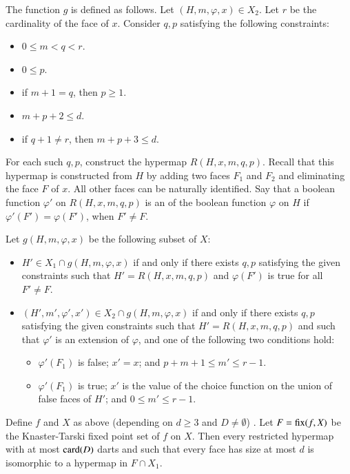 The function $g$ is defined as follows.  Let $(H,m,\varphi,x)\in X_2$.
Let $r$ be the cardinality of the face of $x$.  Consider $q,p$
satisfying the following constraints:
\begin{itemize}
\item $0\le m < q < r$.
\item $0\le p$.
\item if $m+1 = q$, then $p \ge 1$.
\item $m+p+2 \le d$.
\item if $q+1\ne r$, then $m+p+3\le d$.
\end{itemize}

For each such $q,p$, construct the hypermap $R(H,x,m,q,p)$.  Recall
that this hypermap is constructed from $H$ by adding two faces $F_1$
and $F_2$ and eliminating the face $F$ of $x$.  All other faces can be
naturally identified.  Say that a boolean function $\varphi'$ on
$R(H,x,m,q,p)$ is an  of the boolean function
$\varphi$ on $H$ if $\varphi'(F') =\varphi(F')$, when $F'\ne F$.
%

Let $g(H,m,\varphi,x)$ be the following subset of $X$:
\begin{itemize}
\item $H'\in X_1\cap g(H,m,\varphi,x)$ if and only if there exists
$q,p$ satisfying the given constraints such that $H'=R(H,x,m,q,p)$
and $\varphi(F')$ is true for all $F'\ne F$.
\item $(H',m',\varphi',x')\in X_2\cap g(H,m,\varphi,x)$ if and only if
there exists $q,p$ satisfying the given constraints such that
$H'=R(H,x,m,q,p)$ and such that $\varphi'$ is an extension of
$\varphi$, and one of the following two conditions hold:
\begin{itemize}
\item $\varphi'(F_1)$ is false;  $x' = x$; and  $p+m+1 \le m' \le r-1$.
\item $\varphi'(F_1)$ is true; $x'$ is the value of the choice
function on the union of false faces of $H'$; and $0 \le m' \le
r-1$.
\end{itemize}
\end{itemize}





\begin{lemma}  
Define $f $ and $X$ as above (depending on $d\ge 3$ and $D\ne
\emptyset$) .  Let $F={\operatorname{fix}}(f,X)$ be the Knaster-Tarski fixed
point set of $f$ on $X$.  Then every restricted hypermap with at
most ${\operatorname{card}}(D)$ darts and such that every face has size at most $d$
is isomorphic to a hypermap in $F\cap X_1$.
\end{lemma}
%

